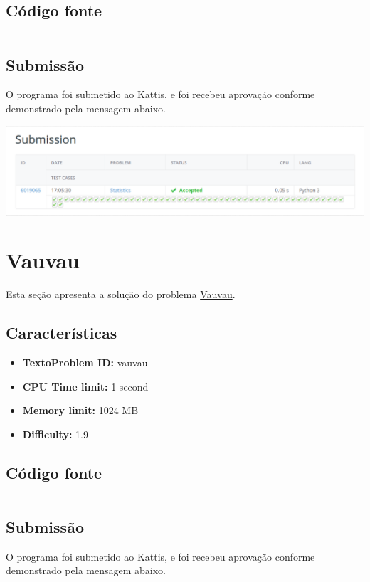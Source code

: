 \documentclass[11pt,a4paper]{scrreprt}
\begin{document}
\subsection{Código fonte}

\inputminted[linenos]{python}{src/Statistics.py}

\subsection{Submissão}
O programa foi submetido ao Kattis, e foi recebeu aprovação conforme demonstrado pela mensagem abaixo.

\includegraphics[scale=0.47]{img/statistics.png}

\section{Vauvau}

Esta seção apresenta a solução do problema \href{https://open.kattis.com/problems/vauvau}{Vauvau}.

\subsection{Características}

\begin{itemize}
    \item\textbf{TextoProblem ID: } vauvau
    \item\textbf{CPU Time limit: } 1 second
    \item\textbf{Memory limit: } 1024 MB
    \item\textbf{Difficulty: }  1.9
\end{itemize}

\subsection{Código fonte}

\inputminted[linenos]{python}{src/Vauvau.py}

\subsection{Submissão}
O programa foi submetido ao Kattis, e foi recebeu aprovação conforme demonstrado pela mensagem abaixo.
\end{document}

